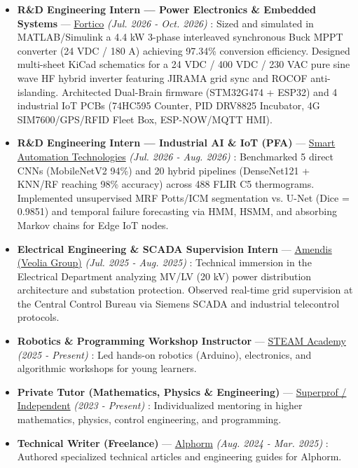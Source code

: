 \documentclass[10pt,a4paper]{article}
\begin{document}
\begin{itemize}
\item \textbf{R\&D Engineering Intern --- Power Electronics \& Embedded Systems} --- \href{https://sitewebfortico.vercel.app/fr}{Fortico} \textit{(Jul. 2026 - Oct. 2026)} : Sized and simulated in MATLAB/Simulink a 4.4 kW 3-phase interleaved synchronous Buck MPPT converter (24 VDC / 180 A) achieving 97.34\% conversion efficiency. Designed multi-sheet KiCad schematics for a 24 VDC / 400 VDC / 230 VAC pure sine wave HF hybrid inverter featuring JIRAMA grid sync and ROCOF anti-islanding. Architected Dual-Brain firmware (STM32G474 + ESP32) and 4 industrial IoT PCBs (74HC595 Counter, PID DRV8825 Incubator, 4G SIM7600/GPS/RFID Fleet Box, ESP-NOW/MQTT HMI).
\item \textbf{R\&D Engineering Intern --- Industrial AI \& IoT (PFA)} --- \href{https://www.linkedin.com/company/smart-automation-technologies/home/}{Smart Automation Technologies} \textit{(Jul. 2026 - Aug. 2026)} : Benchmarked 5 direct CNNs (MobileNetV2 94\%) and 20 hybrid pipelines (DenseNet121 + KNN/RF reaching 98\% accuracy) across 488 FLIR C5 thermograms. Implemented unsupervised MRF Potts/ICM segmentation vs. U-Net (Dice = 0.9851) and temporal failure forecasting via HMM, HSMM, and absorbing Markov chains for Edge IoT nodes.
\item \textbf{Electrical Engineering \& SCADA Supervision Intern} --- \href{https://www.amendis.ma/}{Amendis (Veolia Group)} \textit{(Jul. 2025 - Aug. 2025)} : Technical immersion in the Electrical Department analyzing MV/LV (20 kV) power distribution architecture and substation protection. Observed real-time grid supervision at the Central Control Bureau via Siemens SCADA and industrial telecontrol protocols.
\item \textbf{Robotics \& Programming Workshop Instructor} --- \href{https://www.facebook.com/steamacademy.ma/}{STEAM Academy} \textit{(2025 - Present)} : Led hands-on robotics (Arduino), electronics, and algorithmic workshops for young learners.
\item \textbf{Private Tutor (Mathematics, Physics \& Engineering)} --- \href{https://www.superprof.ma/}{Superprof / Independent} \textit{(2023 - Present)} : Individualized mentoring in higher mathematics, physics, control engineering, and programming.
\item \textbf{Technical Writer (Freelance)} --- \href{https://www.alphorm.com/}{Alphorm} \textit{(Aug. 2024 - Mar. 2025)} : Authored specialized technical articles and engineering guides for Alphorm.

\end{itemize}
\end{document}
